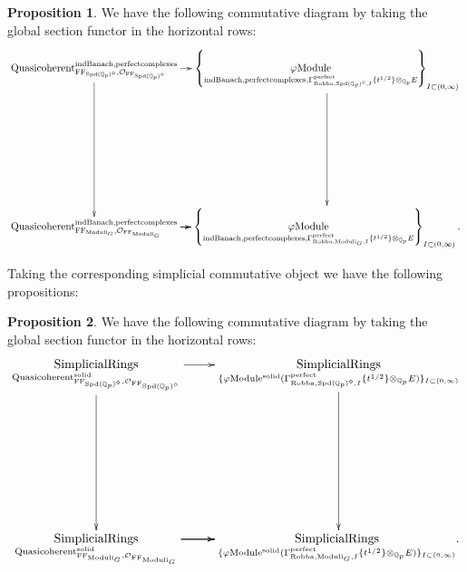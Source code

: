 \documentclass[12pt]{book}
\theoremstyle{definition}
\newtheorem{proposition}{Proposition}
\begin{document}
\begin{proposition}
We have the following commutative diagram by taking the global section functor in the horizontal rows:
\[\displayindent=+0in
\xymatrix@C-0.2in@R+7pc{
\mathrm{Quasicoherent}^{\mathrm{indBanach,perfectcomplexes}}_{\mathrm{FF}_{\mathrm{Spd}(\mathbb{Q}_p)^\diamond},\mathcal{O}_{\mathrm{FF}_{\mathrm{Spd}(\mathbb{Q}_p)^\diamond}}} \ar[d]\ar[r] &
\left\{\underset{\mathrm{indBanach,perfectcomplexes},\Gamma^\text{perfect}_{\text{Robba},\mathrm{Spd}(\mathbb{Q}_p)^\diamond,I}\{t^{1/2}\}\otimes_{\mathbb{Q}_p}E}{\varphi\mathrm{Module}}\right\}_{I\subset (0,\infty)}\ar[d]\\
\mathrm{Quasicoherent}^{\mathrm{indBanach,perfectcomplexes}}_{\mathrm{FF}_{\mathrm{Moduli}_G},\mathcal{O}_{\mathrm{FF}_{\mathrm{Moduli}_G}}}  \ar[r] \ar[r] \ar[r] &
\left\{\underset{\mathrm{indBanach,perfectcomplexes},\Gamma^\text{perfect}_{\text{Robba},\mathrm{Moduli}_G,I}\{t^{1/2}\}\otimes_{\mathbb{Q}_p}E}{\varphi\mathrm{Module}}\right\}_{I\subset (0,\infty)}.    
}
\]

\end{proposition}


\indent Taking the corresponding simplicial commutative object we have the following propositions:

\begin{proposition}
We have the following commutative diagram by taking the global section functor in the horizontal rows:
\[\displayindent=+0in
\xymatrix@R+7pc{
\underset{\mathrm{Quasicoherent}^{\mathrm{solid}}_{\mathrm{FF}_{\mathrm{Spd}(\mathbb{Q}_p)^\diamond},\mathcal{O}_{\mathrm{FF}_{\mathrm{Spd}(\mathbb{Q}_p)^\diamond}}}}{\mathrm{SimplicialRings}} \ar[d] \ar[r] &\underset{\{\varphi\mathrm{Module}^{\mathrm{solid}}(\Gamma^\text{perfect}_{\text{Robba},{\mathrm{Spd}(\mathbb{Q}_p)^\diamond},I}\{t^{1/2}\}\otimes_{\mathbb{Q}_p}E)\}_{I\subset (0,\infty)}}{\mathrm{SimplicialRings}} \ar[d]\\
\underset{\mathrm{Quasicoherent}^{\mathrm{solid}}_{\mathrm{FF}_{\mathrm{Moduli}_G},\mathcal{O}_{\mathrm{FF}_{\mathrm{Moduli}_G}}}}{\mathrm{SimplicialRings}}  \ar[r] \ar[r] \ar[r] &\underset{\{\varphi\mathrm{Module}^{\mathrm{solid}}(\Gamma^\text{perfect}_{\text{Robba},{\mathrm{Moduli}_G},I}\{t^{1/2}\}\otimes_{\mathbb{Q}_p}E)\}_{I\subset (0,\infty)}}{\mathrm{SimplicialRings}}.
}
\]
\end{proposition}
\end{document}
